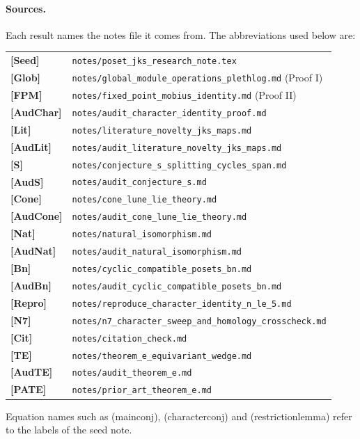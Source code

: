 \documentclass[11pt]{article}
\theoremstyle{definition}
\theoremstyle{remark}
\newcommand{\src}[1]{\nolinkurl{#1}}
\begin{document}
\paragraph{Sources.} Each result names the notes file it comes from. The
abbreviations used below are:
\begin{center}
\small
\begin{tabular}{ll}
\textbf{[Seed]} & \src{notes/poset_jks_research_note.tex}\\
\textbf{[Glob]} & \src{notes/global_module_operations_plethlog.md} (Proof I)\\
\textbf{[FPM]} & \src{notes/fixed_point_mobius_identity.md} (Proof II)\\
\textbf{[AudChar]} & \src{notes/audit_character_identity_proof.md}\\
\textbf{[Lit]} & \src{notes/literature_novelty_jks_maps.md}\\
\textbf{[AudLit]} & \src{notes/audit_literature_novelty_jks_maps.md}\\
\textbf{[S]} & \src{notes/conjecture_s_splitting_cycles_span.md}\\
\textbf{[AudS]} & \src{notes/audit_conjecture_s.md}\\
\textbf{[Cone]} & \src{notes/cone_lune_lie_theory.md}\\
\textbf{[AudCone]} & \src{notes/audit_cone_lune_lie_theory.md}\\
\textbf{[Nat]} & \src{notes/natural_isomorphism.md}\\
\textbf{[AudNat]} & \src{notes/audit_natural_isomorphism.md}\\
\textbf{[Bn]} & \src{notes/cyclic_compatible_posets_bn.md}\\
\textbf{[AudBn]} & \src{notes/audit_cyclic_compatible_posets_bn.md}\\
\textbf{[Repro]} & \src{notes/reproduce_character_identity_n_le_5.md}\\
\textbf{[N7]} & \src{notes/n7_character_sweep_and_homology_crosscheck.md}\\
\textbf{[Cit]} & \src{notes/citation_check.md}\\
\textbf{[TE]} & \src{notes/theorem_e_equivariant_wedge.md}\\
\textbf{[AudTE]} & \src{notes/audit_theorem_e.md}\\
\textbf{[PATE]} & \src{notes/prior_art_theorem_e.md}
\end{tabular}
\end{center}
Equation names such as (mainconj), (characterconj) and (restrictionlemma)
refer to the labels of the seed note.
\end{document}
